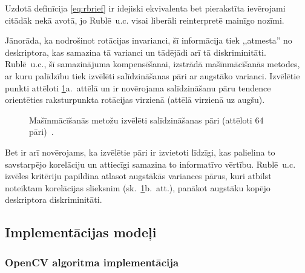Uzdotā definīcija \eqref{eq:rbrief} ir idejiski ekvivalenta bet 
pierakstīta ievērojami citādāk nekā \cite{ORB} avotā, jo 
Rublē~u.c. visai liberāli reinterpretē mainīgo nozīmi.

Jānorāda, ka nodrošinot rotācijas invarianci, šī informācija tiek
,,atmesta'' no deskriptora, kas samazina tā varianci un tādējādi arī
tā diskriminitāti. Rublē~u.c.\cite{ORB}, šī samazinājuma kompensēšanai,
izstrādā mašīnmācīšanās metodes, ar kuru palīdzību tiek izvēlēti
salīdzināšanas pāri ar augstāko varianci. Izvēlētie punkti attēloti
\ref{fig:pattern2}a.~attēlā un ir novērojama salīdzināšanu pāru tendence
orientēties raksturpunkta rotācijas virzienā (attēlā virzienā uz augšu).
\begin{figure}[tbh]
	\centering
	\def\svgwidth{0.7\linewidth}
	{}
	\caption{Mašīnmācīšanās metožu izvēlēti salīdzināšanas pāri
		(attēloti 64 pāri)~\cite{ORB}.}
	\label{fig:pattern2}
\end{figure}
Bet ir arī novērojams, ka izvēlētie pāri ir izvietoti līdzīgi, kas palielina
to savstarpējo korelāciju
un attiecīgi samazina to informatīvo vērtību. Rublē~u.c.\cite{ORB} izvēles
kritēriju papildina atlasot augstākās variances pārus, kuri atbilst
noteiktam korelācijas slieksnim (sk.~\ref{fig:pattern2}b.~att.), panākot
augstāku kopējo deskriptora diskriminitāti.

\subsection{Implementācijas modeļi}
\subsubsection{OpenCV algoritma implementācija} \label{sec:rbrief-ocv}
\TODO
